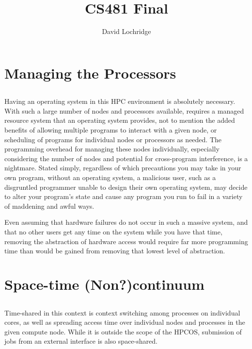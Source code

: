 \documentclass{article}
\title{CS481 Final}
\author{David Lochridge}
\begin{document}
\maketitle

\section{}
\section*{Managing the Processors}
\subsection{}
Having an operating system in this HPC environment is absolutely necessary. With such a large number of nodes and processors available, requires a managed resource system that an operating system provides, not to mention the added benefits of allowing multiple programs to interact with a given node, or scheduling of programs for individual nodes or processors as needed. The programming overhead for managing these nodes individually, especially considering the number of nodes and potential for cross-program interference, is a nightmare. Stated simply, regardless of which precautions you may take in your own program, without an operating system, a malicious user, such as a disgruntled programmer unable to design their own operating system, may decide to alter your program's state and cause any program you run to fail in a variety of maddening and awful ways.

Even assuming that hardware failures do not occur in such a massive system, and that no other users get any time on the system while you have that time, removing the abstraction of hardware access would require far more programming time than would be gained from removing that lowest level of abstraction.

\section*{Space-time (Non?)continuum}
\subsection{}
Time-shared in this context is context switching among processes on individual cores, as well as spreading access time over individual nodes and processes in the given compute node. While it is outside the scope of the HPCOS, submission of jobs from an external interface is also space-shared.
\end{document}
